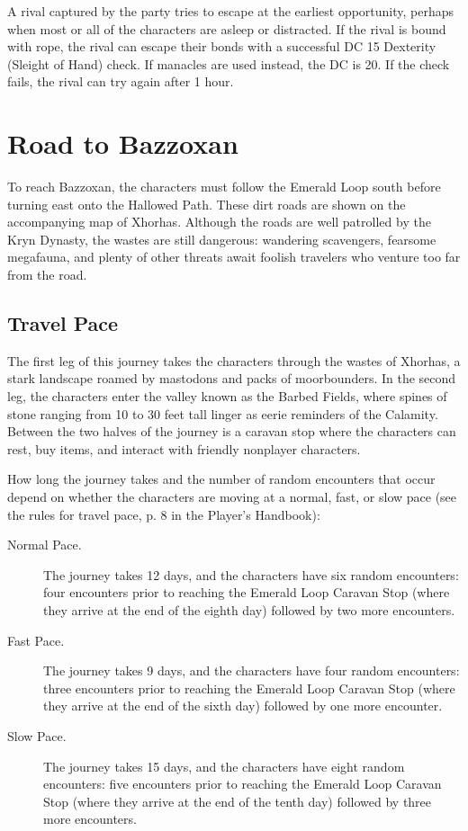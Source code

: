 \documentclass[a4paper, 11pt, bg=full, twocolumn, nooutline]{dndbook}
\begin{document}
A rival captured by the party tries to escape at the earliest opportunity, perhaps when most or all of the characters are asleep or distracted. If the rival is bound with rope, the rival can escape their bonds with a successful DC 15 Dexterity (Sleight of Hand) check. If manacles are used instead, the DC is 20. If the check fails, the rival can try again after 1 hour.
\section{Road to Bazzoxan}

To reach Bazzoxan, the characters must follow the Emerald Loop south before turning east onto the Hallowed Path. These dirt roads are shown on the accompanying map of Xhorhas. Although the roads are well patrolled by the Kryn Dynasty, the wastes are still dangerous: wandering scavengers, fearsome megafauna, and plenty of other threats await foolish travelers who venture too far from the road.



\subsection{Travel Pace}

The first leg of this journey takes the characters through the wastes of Xhorhas, a stark landscape roamed by mastodons and packs of moorbounders. In the second leg, the characters enter the valley known as the Barbed Fields, where spines of stone ranging from 10 to 30 feet tall linger as eerie reminders of the Calamity. Between the two halves of the journey is a caravan stop where the characters can rest, buy items, and interact with friendly nonplayer characters.

How long the journey takes and the number of random encounters that occur depend on whether the characters are moving at a normal, fast, or slow pace (see the rules for travel pace, p. 8 in the Player's Handbook):

\begin{description}
\item[Normal Pace.] The journey takes 12 days, and the characters have six random encounters: four encounters prior to reaching the Emerald Loop Caravan Stop (where they arrive at the end of the eighth day) followed by two more encounters.
\item[Fast Pace.] The journey takes 9 days, and the characters have four random encounters: three encounters prior to reaching the Emerald Loop Caravan Stop (where they arrive at the end of the sixth day) followed by one more encounter.
\item[Slow Pace.] The journey takes 15 days, and the characters have eight random encounters: five encounters prior to reaching the Emerald Loop Caravan Stop (where they arrive at the end of the tenth day) followed by three more encounters.
\end{description}
\end{document}

